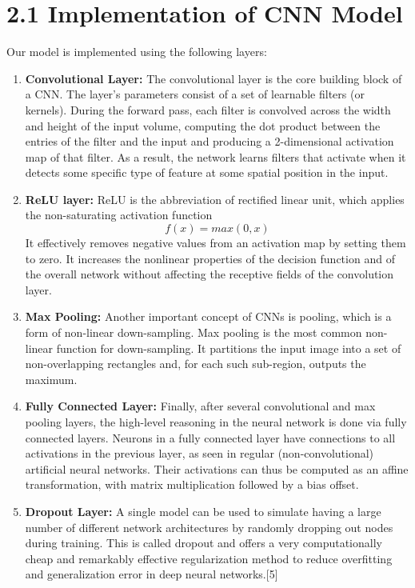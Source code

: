\documentclass[12pt]{report}
\begin{document}
\section*{2.1 Implementation of CNN Model}
Our model is implemented using the following layers: 
\begin{enumerate}
	\item {\textbf{Convolutional Layer:}} The convolutional layer is the core building block of a CNN. The layer's parameters consist of a set of learnable filters (or kernels). During the forward pass, each filter is convolved across the width and height of the input volume, computing the dot product between the entries of the filter and the input and producing a 2-dimensional activation map of that filter. As a result, the network learns filters that activate when it detects some specific type of feature at some spatial position in the input.
	
	\item {\textbf{ReLU layer:}} ReLU is the abbreviation of rectified linear unit, which applies the non-saturating activation function 
\begin{equation}	
	f(x)=max(0, x)
\end{equation} It effectively removes negative values from an activation map by setting them to zero. It increases the nonlinear properties of the decision function and of the overall network without affecting the receptive fields of the convolution layer. 

	\item {\textbf{Max Pooling:}} Another important concept of CNNs is pooling, which is a form of non-linear down-sampling. Max pooling is the most common non-linear function for down-sampling. It partitions the input image into a set of non-overlapping rectangles and, for each such sub-region, outputs the maximum. 
	
	\item \textbf{Fully Connected Layer:} Finally, after several convolutional and max pooling layers, the high-level reasoning in the neural network is done via fully connected layers. Neurons in a fully connected layer have connections to all activations in the previous layer, as seen in regular (non-convolutional) artificial neural networks. Their activations can thus be computed as an affine transformation, with matrix multiplication followed by a bias offset. 
	
	\item \textbf{Dropout Layer:} A single model can be used to simulate having a large number of different network architectures by randomly dropping out nodes during training. This is called dropout and offers a very computationally cheap and remarkably effective regularization method to reduce overfitting and generalization error in deep neural networks.[5]

\end{enumerate}
\end{document}

